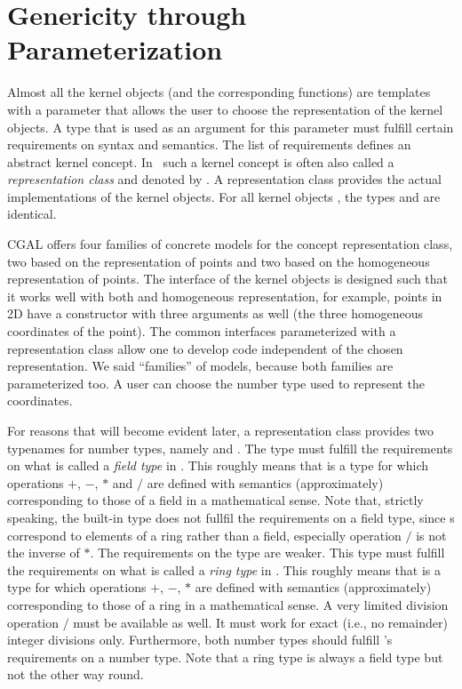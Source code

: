 \section{Genericity through Parameterization}
Almost all the kernel objects (and the corresponding functions) are
templates with a parameter that allows the user to choose the
representation of the kernel objects. A type that is used as an
argument for this parameter must fulfill certain requirements on 
syntax and semantics. The list of requirements defines an abstract
kernel concept. In \cgal\ such a kernel concept is often also called 
a \emph{representation class} and denoted by . A representation 
class provides the actual implementations of the kernel objects.
For all kernel objects , the types 
 and  are identical.

CGAL offers four families of concrete models for the concept
representation class, two based on the  representation of points
and two based on the homogeneous representation of points. 
The interface of the kernel objects is designed such that it works well
with both  and homogeneous representation, for example, points
in 2D have a constructor with three arguments as well
(the three homogeneous coordinates of the point).
The common interfaces parameterized with a representation class allow
one to develop code independent of the chosen representation. 
We said ``families'' of models, because both families are parameterized too.
A user can choose the number type used to represent the coordinates.

For reasons that will become evident later,
a representation class provides two typenames for number types, 
namely  and .%
The type  must fulfill the requirements on what is 
called a {\em field type} in \cgal. This roughly means that  
is a type for which  operations $+$, $-$, $*$ and $/$ are defined
with semantics (approximately) corresponding to those of a field in 
a mathematical sense. Note that, strictly speaking, the built-in type 
 does not fullfil the requirements on a field type, since s
correspond to elements of a ring rather than a field, especially 
operation $/$ is not the inverse of $*$.
The requirements on the type  are weaker.
This type must fulfill the requirements on what is called a {\em ring type}
in \cgal. This roughly means that  
is a type for which  operations $+$, $-$, $*$ are defined with semantics
(approximately) corresponding to those of a ring in a mathematical sense. 
A very limited division operation $/$ must be available as well.
It must work for exact (i.e., no remainder) integer divisions only.
Furthermore, both number types should fulfill \cgal's requirements on a
number type. %
Note that a ring type is always a field type but not the other way 
round.

